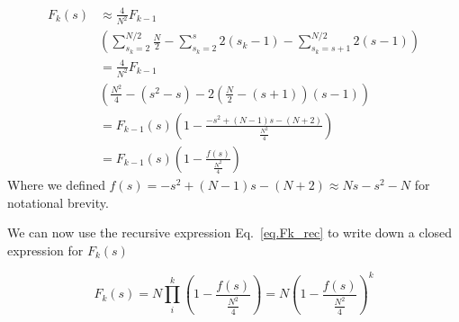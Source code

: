 \documentclass[
reprint,
twocolumn,
amsmath,amssymb,superscriptaddress,aps,
pre]{revtex4-1}
\newcommand{\blue}[1]{\textcolor{blue!80!black}{#1}}
\begin{document}
\blue{\begin{align}
   F_k(s)&\approx \frac{4}{N^2} F_{k-1}\nonumber \\
   &\left( \sum_{s_k=2}^{N/2}\frac{N}{2} - \sum_{s_k=2}^{s} 2(s_k-1) - \sum_{s_k=s+1}^{N/2} 2(s -1) \right) \nonumber \\
   &= \frac{4}{N^2} F_{k-1}\nonumber \\
   &\left(\frac{N^2}{4} -(s^2-s)
   -2\left(\frac{N}{2}-(s+1)\right)(s-1)\right)  \nonumber \\
   &= F_{k-1}(s)\left(1-\frac{-s^2 +(N-1)s-(N+2)}{\frac{N^2}{4}} \right)\nonumber \\
   &=F_{k-1}(s)\left(1-\frac{f(s)}{\frac{N^2}{4}} \right)
   \label{eq.Fk_rec}
\end{align}}
Where we defined $f(s)=-s^2 +(N-1)s-(N+2) \approx N s - s^2 - N$ for notational brevity.

We can now use the recursive expression Eq.~\ref{eq.Fk_rec} to write down a closed expression for $F_k(s)$

\blue{\begin{equation}
    F_k(s)=N\prod_{i}^k\left(1-\frac{f(s)}{\frac{N^2}{4}} \right) = N \left(1-\frac{f(s)}{\frac{N^2}{4}} \right)^k
\end{equation}}
\end{document}
